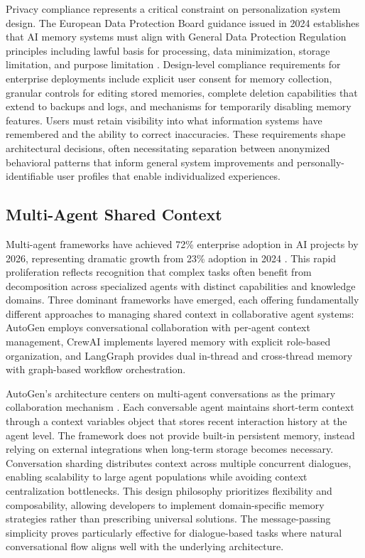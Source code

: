 Privacy compliance represents a critical constraint on personalization system design. The European Data Protection Board guidance issued in 2024 establishes that AI memory systems must align with General Data Protection Regulation principles including lawful basis for processing, data minimization, storage limitation, and purpose limitation \citep{edpb2024guidance}. Design-level compliance requirements for enterprise deployments include explicit user consent for memory collection, granular controls for editing stored memories, complete deletion capabilities that extend to backups and logs, and mechanisms for temporarily disabling memory features. Users must retain visibility into what information systems have remembered and the ability to correct inaccuracies. These requirements shape architectural decisions, often necessitating separation between anonymized behavioral patterns that inform general system improvements and personally-identifiable user profiles that enable individualized experiences.

\subsection{Multi-Agent Shared Context}

Multi-agent frameworks have achieved 72\% enterprise adoption in AI projects by 2026, representing dramatic growth from 23\% adoption in 2024 \citep{amplework2024comparison}. This rapid proliferation reflects recognition that complex tasks often benefit from decomposition across specialized agents with distinct capabilities and knowledge domains. Three dominant frameworks have emerged, each offering fundamentally different approaches to managing shared context in collaborative agent systems: AutoGen employs conversational collaboration with per-agent context management, CrewAI implements layered memory with explicit role-based organization, and LangGraph provides dual in-thread and cross-thread memory with graph-based workflow orchestration.

AutoGen's architecture centers on multi-agent conversations as the primary collaboration mechanism \citep{wu2023autogen}. Each conversable agent maintains short-term context through a context variables object that stores recent interaction history at the agent level. The framework does not provide built-in persistent memory, instead relying on external integrations when long-term storage becomes necessary. Conversation sharding distributes context across multiple concurrent dialogues, enabling scalability to large agent populations while avoiding context centralization bottlenecks. This design philosophy prioritizes flexibility and composability, allowing developers to implement domain-specific memory strategies rather than prescribing universal solutions. The message-passing simplicity proves particularly effective for dialogue-based tasks where natural conversational flow aligns well with the underlying architecture.

